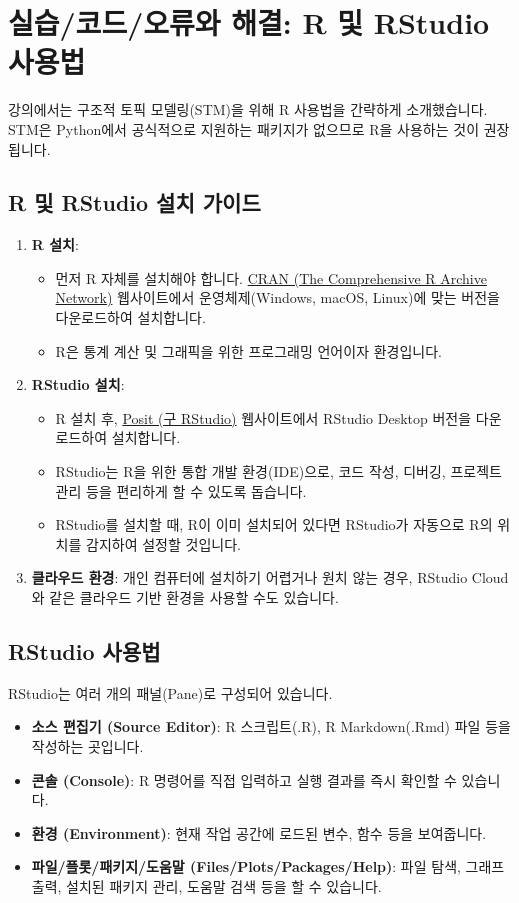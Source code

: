 \documentclass[11pt,a4paper]{article}
\begin{document}
\newpage
\section*{실습/코드/오류와 해결: R 및 RStudio 사용법}
강의에서는 구조적 토픽 모델링(STM)을 위해 R 사용법을 간략하게 소개했습니다. STM은 Python에서 공식적으로 지원하는 패키지가 없으므로 R을 사용하는 것이 권장됩니다.

\subsection*{R 및 RStudio 설치 가이드}
\begin{enumerate}
    \item \textbf{R 설치}:
    \begin{itemize}
        \item 먼저 R 자체를 설치해야 합니다. \href{https://cran.r-project.org/}{CRAN (The Comprehensive R Archive Network)} 웹사이트에서 운영체제(Windows, macOS, Linux)에 맞는 버전을 다운로드하여 설치합니다.
        \item R은 통계 계산 및 그래픽을 위한 프로그래밍 언어이자 환경입니다.
    \end{itemize}
    \item \textbf{RStudio 설치}:
    \begin{itemize}
        \item R 설치 후, \href{https://posit.co/download/rstudio-desktop/}{Posit (구 RStudio)} 웹사이트에서 RStudio Desktop 버전을 다운로드하여 설치합니다.
        \item RStudio는 R을 위한 통합 개발 환경(IDE)으로, 코드 작성, 디버깅, 프로젝트 관리 등을 편리하게 할 수 있도록 돕습니다.
        \item RStudio를 설치할 때, R이 이미 설치되어 있다면 RStudio가 자동으로 R의 위치를 감지하여 설정할 것입니다.
    \end{itemize}
    \item \textbf{클라우드 환경}: 개인 컴퓨터에 설치하기 어렵거나 원치 않는 경우, RStudio Cloud와 같은 클라우드 기반 환경을 사용할 수도 있습니다.
\end{enumerate}

\subsection*{RStudio 사용법}
RStudio는 여러 개의 패널(Pane)로 구성되어 있습니다.
\begin{itemize}
    \item \textbf{소스 편집기 (Source Editor)}: R 스크립트(.R), R Markdown(.Rmd) 파일 등을 작성하는 곳입니다.
    \item \textbf{콘솔 (Console)}: R 명령어를 직접 입력하고 실행 결과를 즉시 확인할 수 있습니다.
    \item \textbf{환경 (Environment)}: 현재 작업 공간에 로드된 변수, 함수 등을 보여줍니다.
    \item \textbf{파일/플롯/패키지/도움말 (Files/Plots/Packages/Help)}: 파일 탐색, 그래프 출력, 설치된 패키지 관리, 도움말 검색 등을 할 수 있습니다.
\end{itemize}
\end{document}
